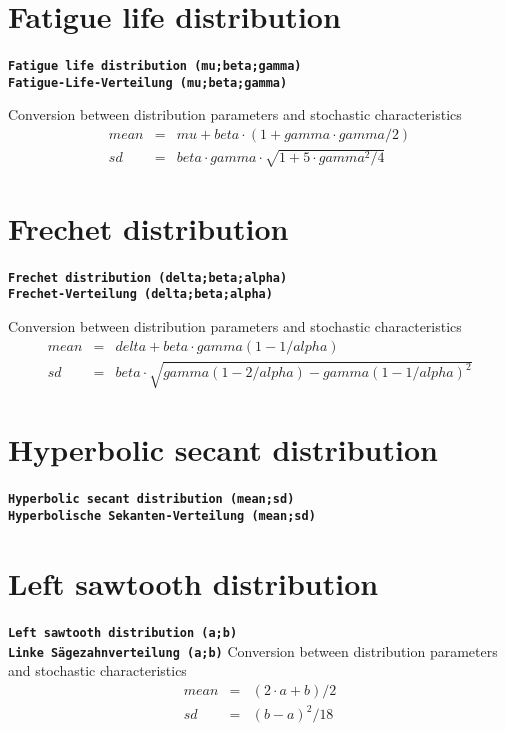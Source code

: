 \documentclass{svmono}
\def\cm#1{\textbf{\texttt{#1}}}
\begin{document}
\section*{Fatigue life distribution}
\cm{Fatigue life distribution (mu;beta;gamma)}~\\
\cm{Fatigue-Life-Verteilung (mu;beta;gamma)}

Conversion between distribution parameters and stochastic characteristics
\begin{eqnarray*}
mean&=&mu+beta\cdot (1+gamma\cdot gamma/2)\\
sd&=&beta\cdot gamma\cdot\sqrt{1+5\cdot gamma^2/4}
\end{eqnarray*}





\section*{Frechet distribution}
\cm{Frechet distribution (delta;beta;alpha)}~\\
\cm{Frechet-Verteilung (delta;beta;alpha)}

Conversion between distribution parameters and stochastic characteristics
\begin{eqnarray*}
mean&=&delta+beta\cdot gamma(1-1/alpha)\\
sd&=&beta\cdot\sqrt{gamma(1-2/alpha)-gamma(1-1/alpha)^2}
\end{eqnarray*}





\section*{Hyperbolic secant distribution}
\cm{Hyperbolic secant distribution (mean;sd)}~\\
\cm{Hyperbolische Sekanten-Verteilung (mean;sd)}





\section*{Left sawtooth distribution}
\cm{Left sawtooth distribution (a;b)}~\\
\cm{Linke Sägezahnverteilung (a;b)}
Conversion between distribution parameters and stochastic characteristics
\begin{eqnarray*}
mean&=&(2\cdot a+b)/2\\
sd&=&(b-a)^2/18
\end{eqnarray*}
\end{document}
